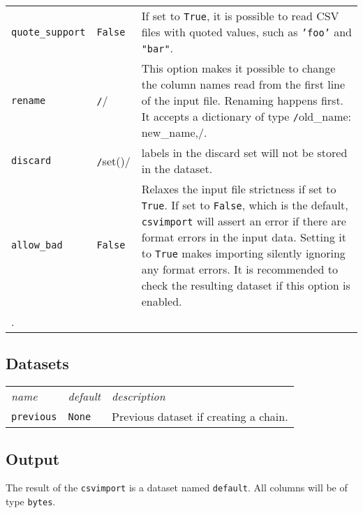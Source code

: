 \begin{tabular}{ p{3.2cm} p{1.8cm} p{10cm}}
  \texttt{quote\_support} & \texttt{False} & If set to \texttt{True},
  it is possible to read CSV files with quoted values, such as
  \texttt{'foo'} and \texttt{"bar"}.\\[1ex]

  \texttt{rename} & \texttt/{}/ & This option makes it possible to
  change the column names read from the first line of the input file.
  Renaming happens first.  It accepts a dictionary of type
  \texttt/{old_name: new_name,}/.\\[1ex]

  \texttt{discard} & \texttt/set()/ & labels in the discard set will
  not be stored in the dataset.\\[1ex]
  
  \texttt{allow\_bad} & \texttt{False} & Relaxes the input file
  strictness if set to \texttt{True}.  If set to \texttt{False}, which
  is the default, \texttt{csvimport} will assert an error if there are
  format errors in the input data.  Setting it to \texttt{True} makes
  importing silently ignoring any format errors.  It is recommended to
  check the resulting dataset if this option is enabled.\\[1ex].
\end{tabular}


\subsection{Datasets}
\begin{tabular}{ p{3.2cm} p{1.8cm} p{10cm}}
  \textsl{name} & \textsl{default} & \textsl{description}\\[2ex]
  \texttt{previous} & \texttt{None} & Previous dataset if creating a
  chain.
\end{tabular}

\subsection{Output}
The result of the \texttt{csvimport} is a dataset named
\texttt{default}.  All columns will be of type \texttt{bytes}.







